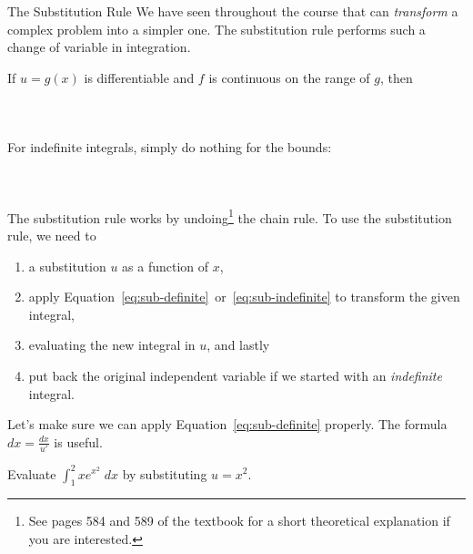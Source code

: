 \documentclass[../main.tex]{subfiles}
\begin{document}
\begin{lesson}{The Substitution Rule}
  We have seen throughout the course that  can \emph{transform} a complex problem into a simpler one. The substitution rule performs such a change of variable in integration.
  \begin{mdframed}[style=withref]
    {If {\color{main} \(u = g(x)\)} is differentiable and \(f\) is continuous on the range of \(g\), then}
    \begin{equation} \label{eq:sub-definite}
      \phantom{\int_{a}^{b} f( {\color{main} g(x)} ) \, {\color{supp} g'(x) \;dx} = \int_{u(a)}^{u(b)} f({\color{main} u}) \;{\color{supp}du}.}
    \end{equation}

    For indefinite integrals, simply do nothing for the bounds: 
    \begin{equation} \label{eq:sub-indefinite}
      \phantom{\int f( {\color{main} g(x)} ) \, {\color{supp} g'(x) \;dx} = \int f(u) \;{\color{supp}du}}
    \end{equation}

  \end{mdframed}
  The substitution rule works by undoing\footnote{See pages 584 and 589 of the textbook for a short theoretical explanation if you are interested.} the chain rule. To use the substitution rule, we need to 
  \begin{enumerate}
    \item \underline{\hspace{1in}} a substitution $u$ as a function of $x$, 
    \item apply Equation~\eqref{eq:sub-definite}~or~\eqref{eq:sub-indefinite} to transform the given integral, 
    \item evaluating the new integral in $u$, and lastly
    \item put back the original independent variable if we started with an \emph{indefinite} integral.
  \end{enumerate}

  \medskip
  Let's make sure we can apply Equation~\eqref{eq:sub-definite} properly.  
  The formula \(dx = \frac{dx}{u'}\) is useful.
  \begin{example} \label{ex:u-sub-2}
    Evaluate \(\int_{1}^{2} x e^{x^{2}} \;dx\) by substituting \(u = x^{2}\).
  \end{example}
  \clearpage


\end{lesson}
\end{document}
